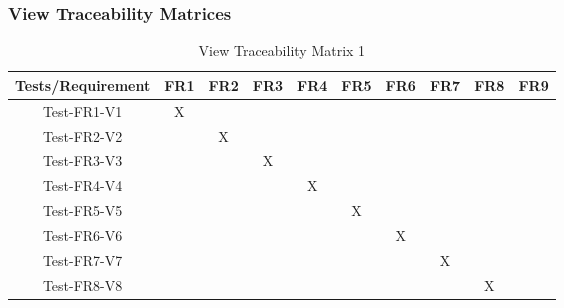 \documentclass[12pt]{article}
\begin{document}
\subsubsection{View Traceability Matrices}
\begin{table}[htp]
\centering
\caption{View Traceability Matrix 1}
\begin{tabular}{|c|c|c|c|c|c|c|c|c|c|}
\hline
Tests/Requirement & FR1 & FR2 & FR3 & FR4 & FR5 & FR6 & FR7 & FR8 & FR9 \\
\hline
Test-FR1-V1       & X   &     &     &     &     &     &     &     &     \\
\hline
Test-FR2-V2       &     & X   &     &     &     &     &     &     &     \\
\hline
Test-FR3-V3       &     &     & X   &     &     &     &     &     &     \\
\hline
Test-FR4-V4       &     &     &     & X   &     &     &     &     &     \\
\hline
Test-FR5-V5       &     &     &     &     & X   &     &     &     &     \\
\hline
Test-FR6-V6       &     &     &     &     &     & X   &     &     &     \\
\hline
Test-FR7-V7       &     &     &     &     &     &     & X   &     &     \\
\hline
Test-FR8-V8       &     &     &     &     &     &     &     & X   &     \\
\hline
\end{tabular}
\end{table}
\end{document}
